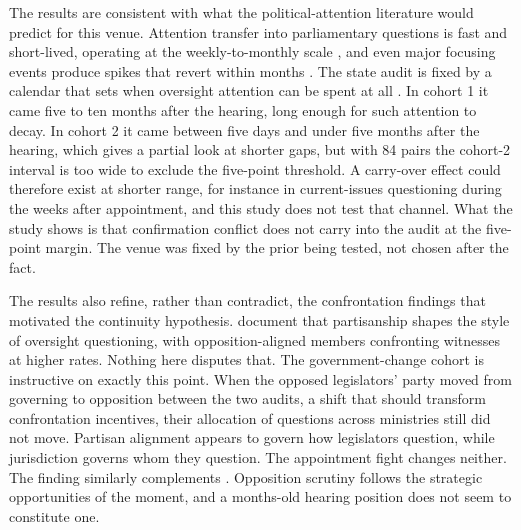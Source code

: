 \documentclass[11pt]{article}
\begin{document}
The results are consistent with what the political-attention literature would predict for this venue. Attention transfer into parliamentary questions is fast and short-lived, operating at the weekly-to-monthly scale \citep{walgrave2007, vliegenthart2016}, and even major focusing events produce spikes that revert within months \citep{birkland1998}. The state audit is fixed by a calendar that sets when oversight attention can be spent at all \citep{ka2025}. In cohort 1 it came five to ten months after the hearing, long enough for such attention to decay. In cohort 2 it came between five days and under five months after the hearing, which gives a partial look at shorter gaps, but with 84 pairs the cohort-2 interval is too wide to exclude the five-point threshold. A carry-over effect could therefore exist at shorter range, for instance in current-issues questioning during the weeks after appointment, and this study does not test that channel. What the study shows is that confirmation conflict does not carry into the audit at the five-point margin. The venue was fixed by the prior being tested, not chosen after the fact.

The results also refine, rather than contradict, the confrontation findings that motivated the continuity hypothesis. \citet{eldes2023} document that partisanship shapes the style of oversight questioning, with opposition-aligned members confronting witnesses at higher rates. Nothing here disputes that. The government-change cohort is instructive on exactly this point. When the opposed legislators' party moved from governing to opposition between the two audits, a shift that should transform confrontation incentives, their allocation of questions across ministries still did not move. Partisan alignment appears to govern how legislators question, while jurisdiction governs whom they question. The appointment fight changes neither. The finding similarly complements \citet{senninger2017}. Opposition scrutiny follows the strategic opportunities of the moment, and a months-old hearing position does not seem to constitute one.
\end{document}
